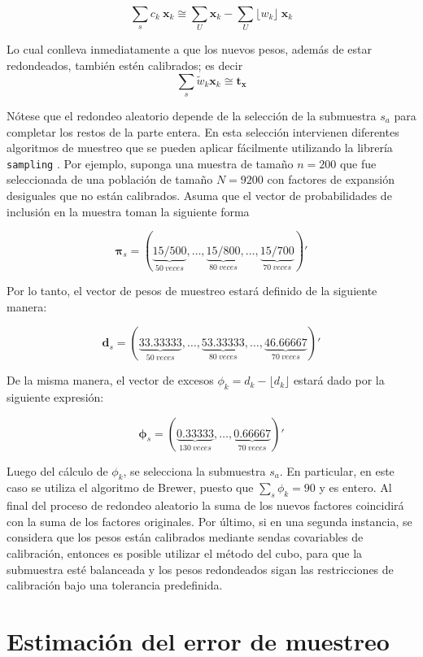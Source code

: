 \documentclass[
  12pt,
  spanish,
]{book}
\begin{document}
\[
\sum_s c_k \ \mathbf{x}_k 
\cong \sum_U \mathbf{x}_k 
- \sum_U \lfloor w_k \rfloor \ \mathbf{x}_k 
\]

Lo cual conlleva inmediatamente a que los nuevos pesos, además de estar redondeados, también estén calibrados; es decir
\[
\sum_s \tilde w_k \mathbf{x}_k \cong  \mathbf{t_x}
\]

Nótese que el redondeo aleatorio depende de la selección de la submuestra \(s_a\) para completar los restos de la parte entera. En esta selección intervienen diferentes algoritmos de muestreo que se pueden aplicar fácilmente utilizando la librería \texttt{sampling} \citep{Matei}. Por ejemplo, suponga una muestra de tamaño \(n= 200\) que fue seleccionada de una población de tamaño \(N=9200\) con factores de expansión desiguales que no están calibrados. Asuma que el vector de probabilidades de inclusión en la muestra toman la siguiente forma

\[
\boldsymbol{\pi}_s = (\underbrace{15/500}_{50 \ veces},
\ldots,
\underbrace{15/800}_{80 \ veces}, 
\ldots,
\underbrace{15/700}_{70 \ veces})'
\]

Por lo tanto, el vector de pesos de muestreo estará definido de la siguiente manera:

\[
\mathbf{d}_s = (\underbrace{33.33333}_{50 \ veces},
\ldots,
\underbrace{53.33333}_{80 \ veces}, 
\ldots,
\underbrace{46.66667}_{70 \ veces})'
\]

De la misma manera, el vector de excesos \(\phi_k = d_k - \lfloor d_k \rfloor\) estará dado por la siguiente expresión:

\[
\boldsymbol{\phi}_s = (\underbrace{0.33333}_{130 \ veces},
\ldots,
\underbrace{0.66667}_{70 \ veces})'
\]

Luego del cálculo de \(\phi_k\), se selecciona la submuestra \(s_a\). En particular, en este caso se utiliza el algoritmo de Brewer, puesto que \(\sum_s\phi_k = 90\) y es entero. Al final del proceso de redondeo aleatorio la suma de los nuevos factores coincidirá con la suma de los factores originales. Por último, si en una segunda instancia, se considera que los pesos están calibrados mediante sendas covariables de calibración, entonces es posible utilizar el método del cubo, para que la submuestra esté balanceada y los pesos redondeados sigan las restricciones de calibración bajo una tolerancia predefinida.

\hypertarget{estimaciuxf3n-del-error-de-muestreo}{%
\chapter{Estimación del error de muestreo}\label{estimaciuxf3n-del-error-de-muestreo}}
\end{document}
